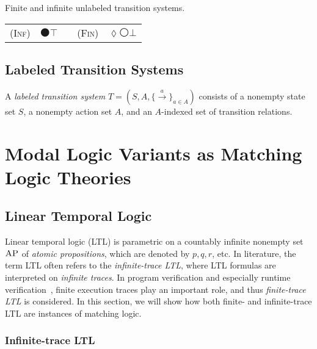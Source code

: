 \documentclass[acmsmall]{acmart}
\newcommand{\xto}[1]{\xrightarrow{#1}}
\newcommand{\AP}{\textsc{AP}}
\newcommand{\wnext}{{\medcirc}}
\newcommand{\snext}{{\medbullet}}
\newcommand{\eventually}{{\lozenge}}
\newcommand{\prule}[1]{\textnormal{(\textsc{#1})}}
\newcommand{\Inf}{\prule{Inf}\xspace}
\newcommand{\Fin}{\prule{Fin}\xspace}
\begin{document}
Finite and infinite unlabeled transition systems.
\begin{center}
\begin{tabular}{llp{1cm}ll}
\Inf &
$\snext \top$
&&
\Fin &
$\eventually \wnext \bot$
\end{tabular}
\end{center}

\subsection{Labeled Transition Systems}

A \emph{labeled transition system}
$T = (S, A, \{ \xto{a} \}_{a \in A})$ consists of
a nonempty state set $S$,
a nonempty action set $A$,
and an $A$-indexed set of transition relations.

\section{Modal Logic Variants as Matching Logic Theories}

\subsection{Linear Temporal Logic}

Linear temporal logic (LTL) is parametric on a
countably infinite nonempty set $\AP$ of \emph{atomic propositions},
which are denoted by $p,q,r$, etc.
In literature, the term LTL often refers to the \emph{infinite-trace LTL},
where LTL formulas are interpreted on \emph{infinite traces}.
In program verification and especially runtime verification~\cite{bibid},
finite execution traces play an important role, and thus
\emph{finite-trace LTL} is considered.
In this section, we will show how
both finite- and infinite-trace LTL are instances of
matching logic.

\subsubsection{Infinite-trace LTL}
\end{document}
